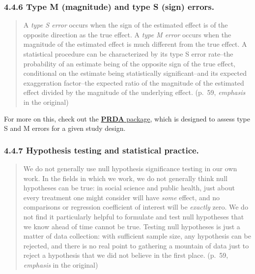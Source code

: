 \documentclass[
]{article}
\begin{document}
\hypertarget{type-m-magnitude-and-type-s-sign-errors.}{%
\subsubsection{4.4.6 Type M (magnitude) and type S (sign)
errors.}\label{type-m-magnitude-and-type-s-sign-errors.}}

\begin{quote}
A \emph{type S error} occurs when the sign of the estimated effect is of
the opposite direction as the true effect. A \emph{type M error} occurs
when the magnitude of the estimated effect is much different from the
true effect. A statistical procedure can be characterized by its type S
error rate--the probability of an estimate being of the opposite sign of
the true effect, conditional on the estimate being statistically
significant--and its expected exaggeration factor--the expected ratio of
the magnitude of the estimated effect divided by the magnitude of the
underlying effect. (p.~59, \emph{emphasis} in the original)
\end{quote}

For more on this, check out the
\href{https://CRAN.R-project.org/package=PRDA}{\textbf{PRDA} package},
which is designed to assess type S and M errors for a given study
design.

\hypertarget{hypothesis-testing-and-statistical-practice.}{%
\subsubsection{4.4.7 Hypothesis testing and statistical
practice.}\label{hypothesis-testing-and-statistical-practice.}}

\begin{quote}
We do not generally use null hypothesis significance testing in our own
work. In the fields in which we work, we do not generally think null
hypotheses can be true: in social science and public health, just about
every treatment one might consider will have \emph{some} effect, and no
comparisons or regression coefficient of interest will be \emph{exactly}
zero. We do not find it particularly helpful to formulate and test null
hypotheses that we know ahead of time cannot be true. Testing null
hypotheses is just a matter of data collection: with sufficient sample
size, any hypothesis can be rejected, and there is no real point to
gathering a mountain of data just to reject a hypothesis that we did not
believe in the first place. (p.~59, \emph{emphasis} in the original)
\end{quote}
\end{document}
